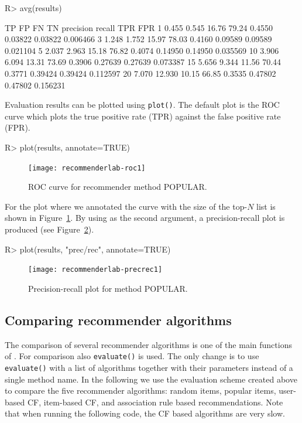 \documentclass[nojss]{jss}
\newcommand{\func}[1]{\mbox{\texttt{#1()}}}
\begin{document}
\begin{Schunk}
\begin{Sinput}
R> avg(results)
\end{Sinput}
\begin{Soutput}
      TP     FP    FN    TN precision  recall     TPR      FPR
1  0.455  0.545 16.76 79.24    0.4550 0.03822 0.03822 0.006466
3  1.248  1.752 15.97 78.03    0.4160 0.09589 0.09589 0.021104
5  2.037  2.963 15.18 76.82    0.4074 0.14950 0.14950 0.035569
10 3.906  6.094 13.31 73.69    0.3906 0.27639 0.27639 0.073387
15 5.656  9.344 11.56 70.44    0.3771 0.39424 0.39424 0.112597
20 7.070 12.930 10.15 66.85    0.3535 0.47802 0.47802 0.156231
\end{Soutput}
\end{Schunk}

Evaluation results can be plotted using \func{plot}. The default
plot is the ROC curve which plots the true positive rate (TPR) against the
false positive rate (FPR).
\begin{Schunk}
\begin{Sinput}
R> plot(results, annotate=TRUE)
\end{Sinput}
\end{Schunk}
\begin{figure}
\centerline{\texttt{[image: recommenderlab-roc1]}}
\caption{ROC curve for recommender method POPULAR.}
\label{fig:roc1}
\end{figure}

For the plot where we annotated the curve with the size of the top-$N$ list
is shown in Figure~\ref{fig:roc1}.
By using  as the second argument, a precision-recall plot
is produced (see Figure~\ref{fig:precrec1}).

\begin{Schunk}
\begin{Sinput}
R> plot(results, "prec/rec", annotate=TRUE)
\end{Sinput}
\end{Schunk}
\begin{figure}
\centerline{\texttt{[image: recommenderlab-precrec1]}}
\caption{Precision-recall plot for method POPULAR.}
\label{fig:precrec1}
\end{figure}

\subsection{Comparing recommender algorithms}

The comparison of
several recommender algorithms is one of the main functions of
. For comparison also \func{evaluate} is used.
The only change is to use \func{evaluate} with
a list of algorithms together with their parameters instead of
a single method name. In the following we use the
evaluation scheme created above to compare the five
recommender algorithms: random items, popular items,
user-based CF, item-based CF, and association rule based recommendations.
Note that when running the following code, the CF based algorithms
are very slow.
\end{document}

